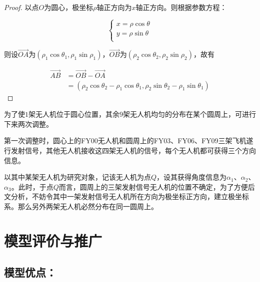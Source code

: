 \begin{proof}
    以点$O$为圆心，极坐标$\rho$轴正方向为$x$轴正方向。则根据参数方程：

    \begin{equation*}
        \begin{cases}
            x = \rho\cos\theta\\
            y = \rho\sin\theta\\
        \end{cases}
    \end{equation*}

    则设$\overrightarrow{OA}$为$(\rho_1\cos\theta_1, \rho_1\sin\rho_1)$，$\overrightarrow{OB}$为$(\rho_2\cos\theta_2, \rho_2\sin\rho_2)$，故有

    \begin{equation}
        \begin{aligned}
            \overrightarrow{AB} &= \overrightarrow{OB} - \overrightarrow{OA} \\
            &=(\rho_2\cos\theta_2 - \rho_1\cos\theta_1, \rho_2\sin\theta_2 - \rho_1\sin\theta_1)
        \end{aligned}
    \end{equation}
\end{proof}

为了使$1$架无人机位于圆心位置，其余$9$架无人机均匀的分布在某个圆周上，可进行下来两次调整。

第一次调整时，圆心上的FY00无人机和圆周上的FY03、FY06、FY09三架飞机遂行发射信号，其他无人机接收这四架无人机的信号，每个无人机都可获得三个方向信息。

以其中某架无人机为研究对象，记该无人机为点$Q$，设其获得角度信息为$\alpha_1$、$\alpha_2$、$\alpha_3$。此时，于点$Q$而言，圆周上的三架发射信号无人机的位置不确定，为了方便后文分析，不妨令其中一架发射信号无人机所在方向为极坐标正方向，建立极坐标系。那么另外两架无人机必然分布在同一圆周上。





\section{模型评价与推广}

\subsection{模型优点：}

